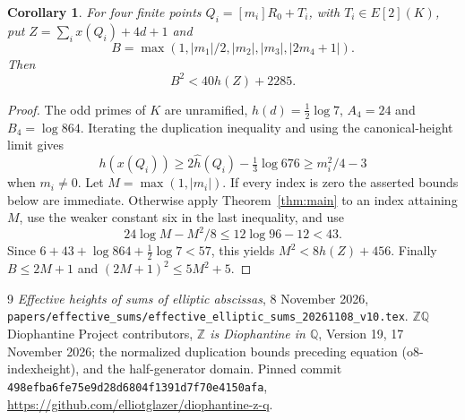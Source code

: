 \documentclass[11pt,a4paper]{article}
\newtheorem{corollary}[theorem]{Corollary}
\newcommand{\Q}{\mathbb Q}\newcommand{\Z}{\mathbb Z}
\begin{document}
\begin{corollary}\label{cor:four}
For four finite points $Q_i=[m_i]R_0+T_i$, with $T_i\in E[2](K)$,
put $Z=\sum_i x(Q_i)+4d+1$ and
\[
 B=\max(1,|m_1|/2,|m_2|,|m_3|,|2m_4+1|).
\]
Then
\[
                         B^2<40h(Z)+2285.
\]
\end{corollary}
\begin{proof}
The odd primes of $K$ are unramified, $h(d)=\tfrac12\log7$,
$A_4=24$ and $B_4=\log864$.
Iterating the duplication inequality and using the canonical-height
limit gives
\[
 h(x(Q_i))\ge2\widehat h(Q_i)-\tfrac13\log676
             \ge m_i^2/4-3
\]
when $m_i\ne0$. Let $M=\max(1,|m_i|)$.
If every index is zero the asserted bounds below are immediate.
Otherwise apply Theorem~\ref{thm:main} to an index attaining $M$,
use the weaker constant six in the last inequality, and use
\[
 24\log M-M^2/8\le12\log96-12<43.
\]
Since $6+43+\log864+\tfrac12\log7<57$, this yields
$M^2<8h(Z)+456$.
Finally $B\le2M+1$ and $(2M+1)^2\le5M^2+5$.
\end{proof}

\begin{thebibliography}{9}
\emph{Effective heights of sums of elliptic abscissas},
8 November 2026,
\nolinkurl{papers/effective_sums/effective_elliptic_sums_20261108_v10.tex}.
\(\Z\Q\) Diophantine Project contributors,
\emph{$\Z$ is Diophantine in $\Q$}, Version 19,
17 November 2026; the normalized duplication bounds preceding
equation \textup{(o8-indexheight)}, and the half-generator domain.
Pinned commit \texttt{498efba6fe75e9d28d6804f1391d7f70e4150afa},
\url{https://github.com/elliotglazer/diophantine-z-q}.
\end{thebibliography}
\end{document}
